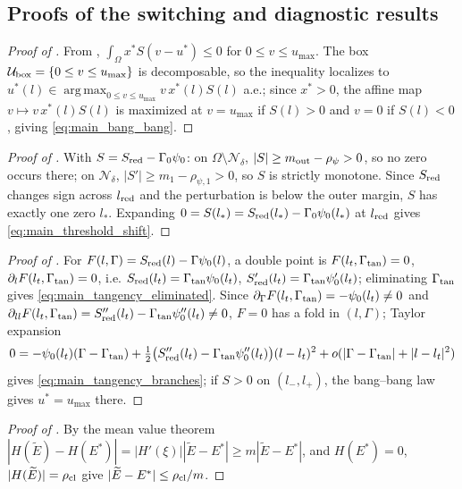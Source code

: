 \documentclass[a4paper,fleqn,longmktitle]{cas-sc}
\theoremstyle{plain}
\theoremstyle{definition}
\theoremstyle{remark}
\numberwithin{equation}{section}
\begin{document}
\subsection{Proofs of the switching and diagnostic results}
\label{subsec:proof_switching}
\begin{proof}[Proof of ]
From , \(\int_\Omega x^*S(v-u^*)\le0\) for
\(0\le v\le u_{\max}\). The box \(\mathcal U_{\rm box}=\{0\le v\le u_{\max}\}\)
is decomposable, so the inequality localizes to
\(u^*(l)\in\operatorname*{arg\,max}_{0\le v\le u_{\max}}v\,x^*(l)S(l)\) a.e.;
since \(x^*>0\), the affine map \(v\mapsto v\,x^*(l)S(l)\) is maximized at
\(v=u_{\max}\) if \(S(l)>0\) and \(v=0\) if \(S(l)<0\), giving
\eqref{eq:main_bang_bang}.
\end{proof}
\begin{proof}[Proof of ]
With \(S=S_{\rm red}-\Gamma_0\psi_0\): on \(\Omega\setminus\mathcal N_\delta\),
\(|S|\ge m_{\rm out}-\rho_\psi>0\), so no zero occurs there; on
\(\mathcal N_\delta\), \(|S'|\ge m_1-\rho_{\psi,1}>0\), so \(S\) is strictly
monotone. Since \(S_{\rm red}\) changes sign across \(l_{\rm red}\) and the
perturbation is below the outer margin, \(S\) has exactly one zero \(l_*\).
Expanding \(0=S(l_*)=S_{\rm red}(l_*)-\Gamma_0\psi_0(l_*)\) at \(l_{\rm red}\)
gives \eqref{eq:main_threshold_shift}.
\end{proof}
\begin{proof}[Proof of ]
For \(F(l,\Gamma)=S_{\rm red}(l)-\Gamma\psi_0(l)\), a double point is
\(F(l_t,\Gamma_{\rm tan})=0\), \(\partial_lF(l_t,\Gamma_{\rm tan})=0\), i.e.
\(S_{\rm red}(l_t)=\Gamma_{\rm tan}\psi_0(l_t)\),
\(S_{\rm red}'(l_t)=\Gamma_{\rm tan}\psi_0'(l_t)\); eliminating
\(\Gamma_{\rm tan}\) gives \eqref{eq:main_tangency_eliminated}. Since
\(\partial_\Gamma F(l_t,\Gamma_{\rm tan})=-\psi_0(l_t)\ne0\) and
\(\partial_{ll}F(l_t,\Gamma_{\rm tan})=S_{\rm red}''(l_t)-\Gamma_{\rm tan}\psi_0''(l_t)\ne0\),
\(F=0\) has a fold in \((l,\Gamma)\); Taylor expansion
\[
    0=
    -\psi_0(l_t)(\Gamma-\Gamma_{\rm tan})
    +
    \tfrac12\big(S_{\rm red}''(l_t)-\Gamma_{\rm tan}\psi_0''(l_t)\big)(l-l_t)^2
    +
    o(|\Gamma-\Gamma_{\rm tan}|+|l-l_t|^2)
\]
gives \eqref{eq:main_tangency_branches}; if \(S>0\) on \((l_-,l_+)\), the
bang--bang law gives \(u^*=u_{\max}\) there.
\end{proof}
\begin{proof}[Proof of ]
By the mean value theorem
\(|H(\widetilde E)-H(E^*)|=|H'(\xi)||\widetilde E-E^*|\ge m|\widetilde E-E^*|\),
and \(H(E^*)=0\), \(|H(\widetilde E)|=\rho_{\rm cl}\) give
\(|\widetilde E-E^*|\le\rho_{\rm cl}/m\).
\end{proof}
\end{document}
